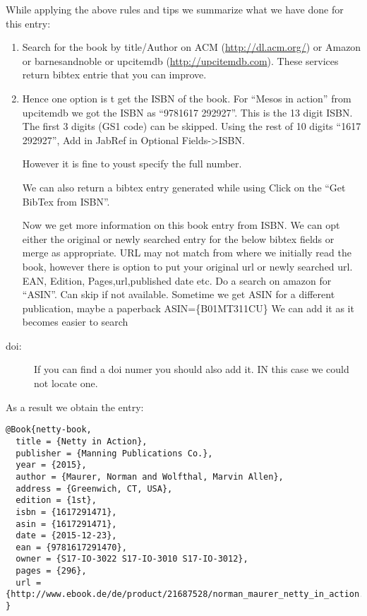 While applying the above rules and tips we summarize what we have done
for this entry:

\begin{enumerate}
\def\labelenumi{\arabic{enumi}.}
\item
  Search for the book by title/Author on ACM (\url{http://dl.acm.org/})
  or Amazon or barnesandnoble or upcitemdb (\url{http://upcitemdb.com}).
  These services return bibtex entrie that you can improve.
\item
  Hence one option is t get the ISBN of the book. For ``Mesos in
  action'' from upcitemdb we got the ISBN as ``9781617 292927''. This is
  the 13 digit ISBN. The first 3 digits (GS1 code) can be skipped. Using
  the rest of 10 digits ``1617 292927'', Add in JabRef in Optional
  Fields-\textgreater{}ISBN.

  However it is fine to youst specify the full number.

  We can also return a bibtex entry generated while using Click on the
  ``Get BibTex from ISBN''.

  Now we get more information on this book entry from ISBN. We can opt
  either the original or newly searched entry for the below bibtex
  fields or merge as appropriate. URL may not match from where we
  initially read the book, however there is option to put your original
  url or newly searched url. EAN, Edition, Pages,url,published date etc.
  Do a search on amazon for ``ASIN''. Can skip if not available.
  Sometime we get ASIN for a different publication, maybe a paperback
  ASIN=\{B01MT311CU\} We can add it as it becomes easier to search
\end{enumerate}

\begin{description}
\item[doi:]
If you can find a doi numer you should also add it. IN this case we
could not locate one.
\end{description}

As a result we obtain the entry:

\begin{verbatim}
@Book{netty-book,
  title = {Netty in Action},
  publisher = {Manning Publications Co.},
  year = {2015},
  author = {Maurer, Norman and Wolfthal, Marvin Allen},
  address = {Greenwich, CT, USA},
  edition = {1st},
  isbn = {1617291471},
  asin = {1617291471},
  date = {2015-12-23},
  ean = {9781617291470},
  owner = {S17-IO-3022 S17-IO-3010 S17-IO-3012},
  pages = {296},
  url = {http://www.ebook.de/de/product/21687528/norman_maurer_netty_in_action.html},
}
\end{verbatim}

